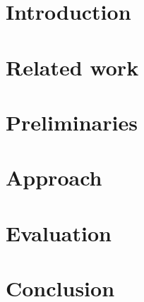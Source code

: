 \documentclass[sigconf,nonacm]{acmart}
\begin{document}



\maketitle

\section{Introduction}
\label{sec:introduction}


\section{Related work}
\label{sec:related}


\section{Preliminaries}
\label{sec:preliminaries}


\section{Approach}
\label{sec:approach}


\section{Evaluation}
\label{sec:evaluation}


\section{Conclusion}
\label{sec:conclusion}





\end{document}
